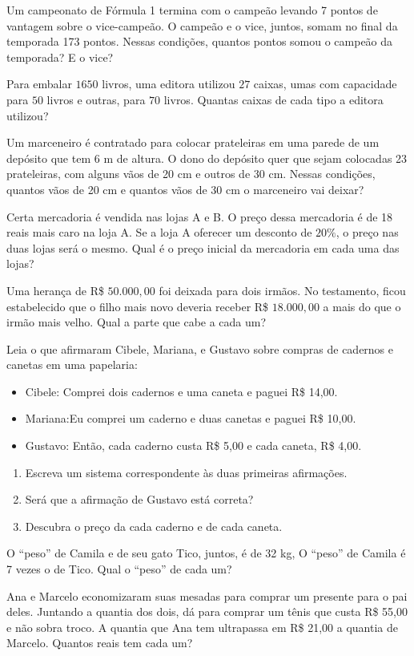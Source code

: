 	\item Um campeonato de Fórmula 1 termina com o campeão levando 7 pontos de vantagem sobre o vice-campeão. O campeão e o vice, juntos, somam no final da temporada 173 pontos. Nessas condições, quantos pontos somou o campeão da temporada? E o vice?
	
	\item Para embalar $1650$ livros, uma editora utilizou $27$ caixas, umas com capacidade para $50$ livros e outras, para $70$ livros. Quantas caixas de cada tipo a editora utilizou?
	
	\item Um marceneiro é contratado para colocar prateleiras em uma parede de um depósito que tem 6 m de altura. O dono do depósito quer que sejam colocadas 23 prateleiras, com alguns vãos de 20 cm e outros de 30 cm. Nessas condições, quantos vãos de 20 cm e quantos vãos de 30 cm o marceneiro vai deixar? 
	
	\item Certa mercadoria é vendida nas lojas A e B. O preço dessa mercadoria é de 18 reais mais caro na loja A. Se a loja A oferecer um desconto de $20\%$, o preço nas duas lojas será o mesmo. Qual é o preço inicial da mercadoria em cada uma das lojas?
	
	\item Uma herança de R\$ $50.000,00$ foi deixada para dois irmãos. No testamento, ficou estabelecido que o filho mais novo deveria receber R\$ $18.000,00$ a mais do que o irmão mais velho. Qual a parte que cabe a cada um?
	
	\item Leia o que afirmaram Cibele, Mariana, e Gustavo sobre compras de cadernos e canetas em uma papelaria:
	\begin{itemize}
		\item Cibele: Comprei dois cadernos e uma caneta e paguei R\$ 14,00.
		\item Mariana:Eu comprei um caderno e duas canetas e paguei R\$ 10,00.
		\item Gustavo: Então, cada caderno custa R\$ 5,00 e cada caneta, R\$ 4,00.
	\end{itemize}
	\begin{enumerate}
		\item Escreva um sistema correspondente às duas primeiras afirmações.
		\item Será que a afirmação de Gustavo está correta?
		\item Descubra o preço da cada caderno e de cada caneta.
	\end{enumerate}
	
	\item O ``peso'' de Camila e de seu gato Tico, juntos, é de 32 kg, O ``peso'' de Camila é 7 vezes o de Tico. Qual o ``peso'' de cada um?
	
	\item Ana e Marcelo economizaram suas mesadas para comprar um presente para o pai deles. Juntando a quantia dos dois, dá para comprar um tênis que custa R\$ 55,00 e não sobra troco. A quantia que Ana tem ultrapassa em R\$ 21,00 a quantia de Marcelo. Quantos reais tem cada um?
	
